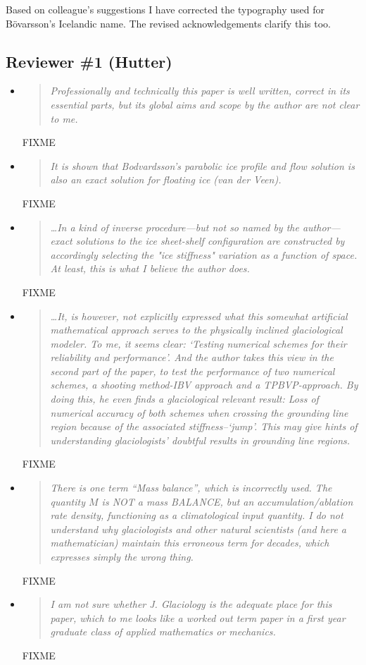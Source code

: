 \documentclass[11pt,reqno]{amsart}
\renewcommand{\dh}{\fontencoding{T1}\selectfont{\symbol{240}}}
\newcommand{\bod}{B\"o\dh varsson\xspace}
\newcommand{\reply}[2]{
\medskip\medskip
\item  \begin{quote}
\emph{#1}
\end{quote}

\medskip
\noindent #2}
\begin{document}
\medskip
\noindent Based on colleague's suggestions I have corrected the typography used for \bod's Icelandic name.  The revised acknowledgements clarify this too.


\subsection*{Reviewer \#1 (Hutter)}  \begin{itemize}
\reply{Professionally and technically this paper is well written, correct in its essential parts, but its global aims and scope by the author are not clear to me.}
{FIXME}

\reply{It is shown that Bodvardsson's parabolic ice profile and flow solution is also an exact solution for floating ice (van der Veen).}
{FIXME}

\reply{\dots In a kind of inverse procedure---but not so named by the author---exact solutions to the ice sheet-shelf configuration are constructed by accordingly selecting the "ice stiffness" variation as a function of space. At least, this is what I believe the author does.}
{FIXME}

\reply{\dots It, is however, not explicitly expressed what this somewhat artificial mathematical approach serves to the physically inclined glaciological modeler. To me, it seems clear: `Testing numerical schemes for their reliability and performance'. And the author takes this view in the second part of the paper, to test the performance of two numerical schemes, a shooting method-IBV approach and a TPBVP-approach. By doing this, he even finds a glaciological relevant result: Loss of numerical accuracy of both schemes when crossing the grounding line region because of the associated stiffness--`jump'.  This may give hints of understanding glaciologists' doubtful results in grounding line regions.}
{FIXME}

\reply{There is one term ``Mass balance'', which is incorrectly used. The quantity $M$ is NOT a mass BALANCE, but an accumulation/ablation rate density, functioning as a climatological input quantity. I do not understand why glaciologists and other natural scientists (and here a mathematician) maintain this erroneous term for decades, which expresses simply the wrong thing.}
{FIXME}

\reply{I am not sure whether J. Glaciology is the adequate place for this paper, which to me looks like a worked out term paper in a first year graduate class of applied mathematics or mechanics.}
{FIXME}

\end{itemize}
\end{document}
